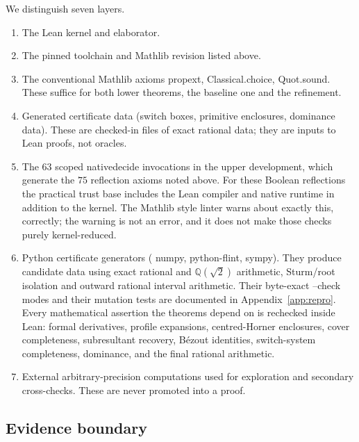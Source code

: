 \documentclass[11pt]{article}
\theoremstyle{plain}
\theoremstyle{definition}
\theoremstyle{remark}
\newcommand{\Q}{\mathbb{Q}}
\newcommand{\lean}[1]{%
  \begingroup\ttfamily\hyphenchar\font=-1\relax
  \def\_{\textunderscore\allowbreak}%
  #1\endgroup}
\begin{document}
We distinguish seven layers.
\begin{enumerate}
  \item The Lean kernel and elaborator.
  \item The pinned toolchain and Mathlib revision listed above.
  \item The conventional Mathlib axioms \lean{propext}, \lean{Classical.choice},
    \lean{Quot.sound}. These suffice for both lower theorems, the baseline one
    and the refinement.
  \item Generated certificate data (switch boxes, primitive enclosures,
    dominance data). These are checked-in files of exact rational data; they are
    inputs to Lean proofs, not oracles.
  \item The $63$ scoped \lean{native\_decide} invocations in the upper
    development, which generate the $75$ reflection axioms noted above. For
    these Boolean reflections the practical trust base includes the Lean
    compiler and native runtime in addition to the kernel. The Mathlib style
    linter warns about exactly this, correctly; the warning is not an error, and
    it does not make those checks purely kernel-reduced.
  \item Python certificate generators (\lean{numpy}, \lean{python-flint},
    \lean{sympy}). They produce candidate data using exact rational and
    $\Q(\sqrt2)$ arithmetic, Sturm/root isolation and outward rational interval
    arithmetic. Their byte-exact \lean{--check} modes and their mutation tests are
    documented in Appendix~\ref{app:repro}. Every mathematical assertion the
    theorems depend on is rechecked inside Lean: formal derivatives, profile
    expansions, centred-Horner enclosures, cover completeness, subresultant
    recovery, B\'ezout identities, switch-system completeness, dominance, and the
    final rational arithmetic.
  \item External arbitrary-precision computations used for exploration and
    secondary cross-checks. These are never promoted into a proof.
\end{enumerate}

\subsection{Evidence boundary}\label{sec:evidence}
\end{document}
